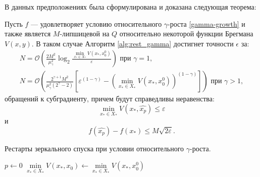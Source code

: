     В данных предположениях была сформулирована и доказана следующая теорема:
    \begin{theorem} \label{simple_restart}
        Пусть $f$ --- удовлетворяет условию относительного $\gamma$-роста \eqref{gamma-growth} и также является $M$-липшицевой на $Q$ относительно некоторой функции Брегмана $V(x, y)$. В таком случае Алгоритм \ref{alg:rest_gamma} достигнет точности $\epsilon$ за:
        \begin{equation}
        \begin{aligned}
           N =\mathcal{O}\left(\frac{2 M^2}{\mu_{\gamma}^2} \log_2{\frac{\min\limits_{x_* \in X_*}{V(x_*, x_0^0)}}{\varepsilon}}\right) \text{ при } \gamma = 1, \\
           N = \mathcal{O}\left(\frac{2^{\gamma + 1} M^2}{\mu_{\gamma}^2 (2^{\gamma} - 2)} \left[\varepsilon^{(1 - \gamma)} - \left(\min\limits_{x_* \in X_*}{V(x_*, x_0^0)}\right)^{(1 - \gamma)}\right]\right) \text{ при } \gamma > 1,
        \end{aligned}
        \end{equation}
        обращений к субградиенту, причем будут справедливы неравенства:
        \begin{equation}
            \min_{x_* \in X_*}{V(x_*, \widehat{x_p})} \leq \varepsilon
        \end{equation}
        и
        \begin{equation}
            f(\widehat{x_p}) - f(x_*) \leq M \sqrt{2 \varepsilon}.  
        \end{equation}
    \end{theorem}

    \begin{algorithm}[htp]
        \caption{Рестарты зеркального спуска при условии относительного $\gamma$-роста.}
        \label{alg:rest_gamma}
        $p \gets 0$\;
        $\min\limits_{x_* \in X_*}{V(x_*, x_0)} \gets \min\limits_{x_* \in X_*}{V(x_*,x_0^0)}$\;
    \end{algorithm}

